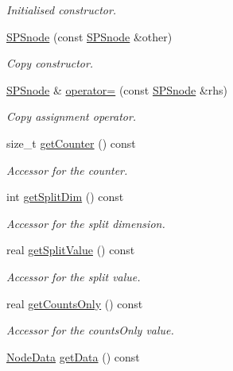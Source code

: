\begin{DoxyCompactItemize}
\begin{DoxyCompactList}\small\item\em \-Initialised constructor. \end{DoxyCompactList}\item 
\hyperlink{classsubpavings_1_1SPSnode_a56a33f7824a42568a7c9535e2ed10c88}{\-S\-P\-Snode} (const \hyperlink{classsubpavings_1_1SPSnode}{\-S\-P\-Snode} \&other)
\begin{DoxyCompactList}\small\item\em \-Copy constructor. \end{DoxyCompactList}\item 
\hyperlink{classsubpavings_1_1SPSnode}{\-S\-P\-Snode} \& \hyperlink{classsubpavings_1_1SPSnode_a65971d98a726cba6cf111882f984de06}{operator=} (const \hyperlink{classsubpavings_1_1SPSnode}{\-S\-P\-Snode} \&rhs)
\begin{DoxyCompactList}\small\item\em \-Copy assignment operator. \end{DoxyCompactList}\item 
size\-\_\-t \hyperlink{classsubpavings_1_1SPSnode_ab4bee06d1b314b064d88842ba720d4a3}{get\-Counter} () const 
\begin{DoxyCompactList}\small\item\em \-Accessor for the counter. \end{DoxyCompactList}\item 
int \hyperlink{classsubpavings_1_1SPSnode_afe262ee997e6ac57a15193a7d585f0ac}{get\-Split\-Dim} () const 
\begin{DoxyCompactList}\small\item\em \-Accessor for the split dimension. \end{DoxyCompactList}\item 
real \hyperlink{classsubpavings_1_1SPSnode_aeaa3e348d84106def631d3cd742a1420}{get\-Split\-Value} () const 
\begin{DoxyCompactList}\small\item\em \-Accessor for the split value. \end{DoxyCompactList}\item 
real \hyperlink{classsubpavings_1_1SPSnode_a4285801767cd577432a0b13cdbdaba43}{get\-Counts\-Only} () const 
\begin{DoxyCompactList}\small\item\em \-Accessor for the counts\-Only value. \end{DoxyCompactList}\item 
\hyperlink{namespacesubpavings_af005697b49cff9ea37fc3bc9ed19da30}{\-Node\-Data} \hyperlink{classsubpavings_1_1SPSnode_a8906934b09d85e67c49d38548e0cd38a}{get\-Data} () const 

\end{DoxyCompactItemize}

